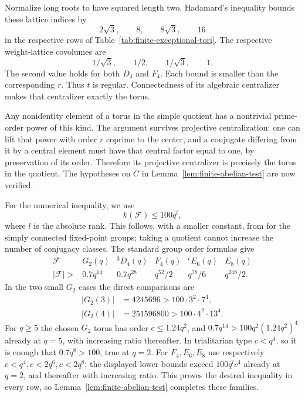 Normalize long roots to have squared length two. Hadamard's
inequality bounds these lattice indices by
\begin{equation}\label{eq:finite-root-index}
 2\sqrt3,\qquad 8,\qquad 8\sqrt3,\qquad16
\end{equation}
in the respective rows of Table~\ref{tab:finite-exceptional-tori}.
The respective weight-lattice covolumes are
\[
 1/\sqrt3,\qquad1/2,\qquad1/\sqrt3,\qquad1.
\]
The second value holds for both $D_4$ and $F_4$.
Each bound is smaller than the corresponding $r$.
Thus $t$ is regular. Connectedness of its algebraic centralizer
makes that centralizer exactly the torus.

Any nonidentity element of a torus in the simple quotient has a
nontrivial prime-order power of this kind. The argument survives
projective centralization: one can lift that power with order $r$
coprime to the center, and a conjugate differing from it by a
central element must have that central factor equal to one,
by preservation of its order. Therefore its projective centralizer
is precisely the torus in the quotient. The hypotheses on $C$
in Lemma~\ref{lem:finite-abelian-test} are now verified.

For the numerical inequality, we use
\begin{equation}\label{eq:finite-exceptional-class-bound}
 k(\mathcal F)\le100q^l,
\end{equation}
where $l$ is the absolute rank. This follows, with a smaller
constant, from \cite[Theorem~1.1, p.~3024]{FulmanGuralnick} for the simply
connected fixed-point groups; taking a quotient cannot increase
the number of conjugacy classes. The standard group order
formulas \cite[Tables~24.1--24.2]{MalleTesterman} give
\[
 \begin{array}{c|ccccc}
 \mathcal F&G_2(q)&{}^3D_4(q)&F_4(q)&{}^{\epsilon}E_6(q)&E_8(q)\\
 \hline
 |\mathcal F|>&0.7q^{14}&0.7q^{28}&q^{52}/2&q^{78}/6&q^{248}/2.
 \end{array}
\]
In the two small $G_2$ cases the direct comparisons are
\[
 \begin{aligned}
 |G_2(3)|&=4245696>100\cdot3^2\cdot7^4,\\
 |G_2(4)|&=251596800>100\cdot4^2\cdot13^4.
 \end{aligned}
\]
For $q\ge5$ the chosen $G_2$ torus has order $c\le1.24q^2$, and
$0.7q^{14}>100q^2(1.24q^2)^4$ already at $q=5$, with increasing
ratio thereafter. In trialitarian type $c<q^4$, so it is enough
that $0.7q^8>100$, true at $q=2$. For $F_4,E_6,E_8$ use respectively
$c<q^4,c<2q^6,c<2q^8$; the displayed lower bounds exceed
$100q^l c^4$ already at $q=2$, and thereafter with increasing
ratio. This proves the desired inequality in every row, so
Lemma~\ref{lem:finite-abelian-test} completes these families.

